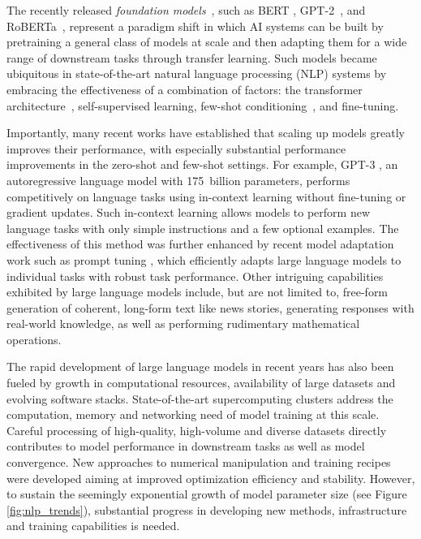 \documentclass[11pt]{article}
\begin{document}
The recently released \emph{foundation models}~\cite{bommasani2021opportunities}, such as BERT \cite{Devlin2019BERTPO}, GPT-2~\cite{gpt2-radford2019language}, and RoBERTa~\cite{liu2019roberta}, represent a paradigm shift in which AI systems can be built by pretraining a general class of models at scale and then adapting them for a wide range of downstream tasks through transfer learning. Such models became ubiquitous in state-of-the-art natural language processing (NLP) systems by embracing the effectiveness of a combination of factors: the transformer architecture~\cite{DBLP:journals/corr/VaswaniSPUJGKP17}, self-supervised learning, few-shot conditioning~\cite{brown2020language}, and fine-tuning.


Importantly, many recent works have established that scaling up models greatly improves their performance, with especially substantial performance improvements in the zero-shot and few-shot settings. For example, GPT-3 \cite{brown2020language}, an autoregressive language model with 175~billion parameters, performs competitively on language tasks using in-context learning without fine-tuning or gradient updates. Such in-context learning allows models to perform new language tasks with only simple instructions and a few optional examples. The effectiveness of this method was further enhanced by recent model adaptation work such as prompt tuning \cite{lester2021power}, which efficiently adapts large language models to individual tasks with robust task performance. Other intriguing capabilities exhibited by large language models include, but are not limited to, free-form generation of coherent, long-form text like news stories, generating responses with real-world knowledge, as well as performing rudimentary mathematical operations.

The rapid development of large language models in recent years has also been fueled by growth in computational resources, availability of large datasets and evolving software stacks. State-of-the-art supercomputing clusters address the computation, memory and networking need of model training at this scale. Careful processing of high-quality, high-volume and diverse datasets directly contributes to model performance in downstream tasks as well as model convergence. New approaches to numerical manipulation and training recipes were developed aiming at improved optimization efficiency and stability. However, to sustain the seemingly exponential growth of model parameter size (see Figure \ref{fig:nlp_trends}), substantial progress in developing new methods, infrastructure and training capabilities is needed.
\end{document}

